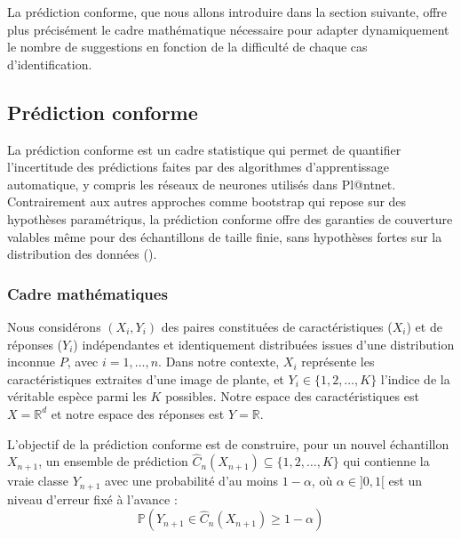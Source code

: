 \documentclass[a4paper,12pt]{article}
\begin{document}
\vspace{0.2cm}

La prédiction conforme, que nous allons introduire dans la section suivante, offre plus précisément le cadre mathématique nécessaire pour adapter dynamiquement le nombre de suggestions en fonction de la difficulté de chaque cas d'identification.


\subsection{Prédiction conforme}

La prédiction conforme est un cadre statistique qui permet de quantifier l'incertitude des prédictions faites par des algorithmes d'apprentissage automatique, y compris les réseaux de neurones utilisés dans Pl@ntnet. Contrairement aux autres approches comme bootstrap qui repose sur des hypothèses paramétriqus, la prédiction conforme offre des garanties de couverture valables même pour des échantillons de taille finie, sans hypothèses fortes sur la distribution des données (\cite{ShaferVovk}).

\subsubsection{Cadre mathématiques}

Nous considérons $(X_i, Y_i)$ des paires constituées de caractéristiques ($X_i$) et de réponses ($Y_i$) indépendantes et identiquement distribuées issues d'une distribution inconnue $P$, avec $i = 1, \dots, n$. Dans notre contexte, $X_i$ représente les caractéristiques extraites d'une image de plante, et $Y_i \in \{1, 2, \dots, K\}$ l'indice de la véritable espèce parmi les $K$ possibles. Notre espace des caractéristiques est $X = \mathbb R^d$ et notre espace des réponses est $Y = \mathbb R$.

\vspace{0.2cm}

L'objectif de la prédiction conforme est de construire, pour un nouvel échantillon $X_{n+1}$, un ensemble de prédiction $\hat{C}_n(X_{n+1}) \subseteq \{1, 2, \dots, K\}$ qui contienne la vraie classe $Y_{n+1}$ avec une probabilité d'au moins $1 - \alpha$, où $\alpha \in ]0,1[$ est un niveau d'erreur fixé à l'avance : 
$$ \mathbb P(Y_{n+1} \in \hat C_n (X_{n+1}) \geq 1 - \alpha) $$

\vspace{0.2cm}
\end{document}
